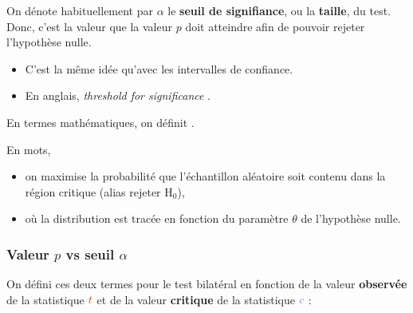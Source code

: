 \documentclass[french]{article}
\begin{document}
\begin{multicols*}{2}
\begin{definitionNOHFILLsub}
On dénote habituellement par $\alpha$ le \textbf{seuil de signifiance}, ou la \textbf{taille}, du test. Donc, c'est la valeur que la valeur $p$ doit atteindre afin de pouvoir rejeter l'hypothèse nulle.

\begin{itemize}
	\item	C'est la même idée qu'avec les intervalles de confiance. 
	\item	En anglais, \og \textit{threshold for significance} \fg{}.
\end{itemize}

\bigskip

En termes mathématiques, on définit . 

\bigskip

En mots, 
\begin{itemize}
	\item	on \textcolor{indigo(web)}{maximise} la probabilité que \textcolor{bondiblue!80!black}{l'échantillon aléatoire} soit \textcolor{armygreen}{contenu} dans \textcolor{bulgarianrose!90!black}{la région critique} (alias rejeter $\textrm{H}_{0}$), 
	\item	où la distribution est tracée \textcolor{amethyst}{en fonction du paramètre $\theta$} de \textcolor{pastelred}{l'hypothèse nulle}.
\end{itemize}
\end{definitionNOHFILLsub}



\subsubsection{Valeur \texorpdfstring{$p$}{p} vs seuil \texorpdfstring{$\alpha$}{alpha}}
On défini ces deux termes pour le test bilatéral en fonction de la valeur \textbf{\textcolor{burntorange}{observée}} de la statistique $\textcolor{burntorange}{t}$ et de la valeur \textbf{\textcolor{amethyst}{critique}} de la statistique $\textcolor{amethyst}{c}$ : 

\bigskip


\end{multicols*}
\end{document}
